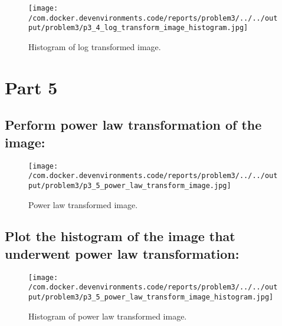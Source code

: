 \documentclass{article}%
\begin{document}
\begin{figure}[h!]%
\centering%
\texttt{[image: /com.docker.devenvironments.code/reports/problem3/../../output/problem3/p3\_4\_log\_transform\_image\_histogram.jpg]}%
\caption{Histogram of log transformed image.}%
\end{figure}

%
\newpage%
\section{Part 5}%
\label{sec:Part5}%
\subsection{Perform power law transformation of the image:}%
\label{subsec:Performpowerlawtransformationoftheimage}%


\begin{figure}[h!]%
\centering%
\texttt{[image: /com.docker.devenvironments.code/reports/problem3/../../output/problem3/p3\_5\_power\_law\_transform\_image.jpg]}%
\caption{Power law transformed image.}%
\end{figure}

%
\subsection{Plot the histogram of the image that underwent power law transformation:}%
\label{subsec:Plotthehistogramoftheimagethatunderwentpowerlawtransformation}%


\begin{figure}[h!]%
\centering%
\texttt{[image: /com.docker.devenvironments.code/reports/problem3/../../output/problem3/p3\_5\_power\_law\_transform\_image\_histogram.jpg]}%
\caption{Histogram of power law transformed image.}%
\end{figure}

%
\end{document}
